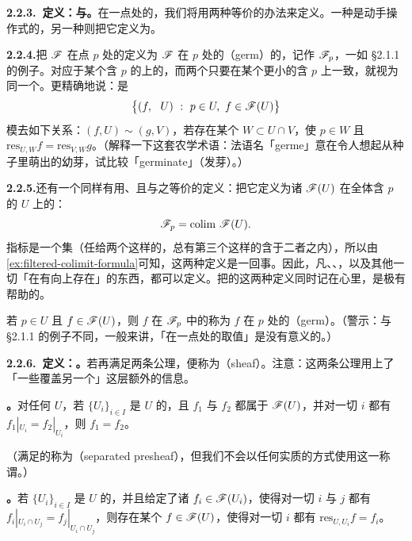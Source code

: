 \textbf{2.2.3.\ 定义：\trStalk{}与\trGerm。}\quad \trPresheaf{}在一点处的\trStalk，我们将用两种等价的办法来定义。一种是动手操作式的，另一种则把它定义为\trColimit。

\textbf{2.2.4.}\quad 把\trPresheaf{} $\mathscr{F}$ 在点 $p$ 处的\textbf{\trStalk}定义为 $\mathscr{F}$ 在 $p$ 处的\textbf{\trGerm}（germ）的\trSet，记作 $\mathscr{F}_p$，一如 \S2.1.1 的例子。\trGerm{}对应于某个含 $p$ 的\trOpenSet{}上的\trSection，而两个\trSection{}只要在某个更小的含 $p$ \trOpenSet{}上一致，就视为同一个。更精确地说：\trStalk{}是
\[
\bigl\{(f,\ \text{\trOpenSet{} } U)\ :\ p\in U,\ f\in\scr{F}(U)\bigr\}
\]
模去如下关系：$(f,U)\sim(g,V)$，若存在某个\trOpenSet{} $W\subset U\cap V$，使 $p\in W$ 且 $\mathrm{res}_{U,W}f=\mathrm{res}_{V,W}g$。（解释一下这套农学术语：法语名「germe」意在令人想起从种子里萌出的幼芽，试比较「germinate」（发芽）。）

\textbf{2.2.5.}\quad \trStalk{}还有一个同样有用、且与之等价的定义：把它定义为诸 $\mathscr{F}(U)$ 在全体含 $p$ 的\trOpenSet{} $U$ 上的\trColimit：
\[
\mathscr{F}_p=\operatorname{colim}\,\mathscr{F}(U).
\]
指标\trCategory{}是一个\trFiltered{}集（任给两个这样的\trOpenSet，总有第三个这样的\trOpenSet{}含于二者之内），所以由\cref{ex:filtered-colimit-formula}可知，这两种定义是一回事。因此，凡\trSetsWord\trSheaf、\trGroup\trSheaf、\trRing\trSheaf，以及其他一切「\trColimit{}在有向\trSet{}上存在」的东西，都可以定义\trStalk。把\trStalk{}的这两种定义同时记在心里，是极有帮助的。

若 $p\in U$ 且 $f\in\mathscr{F}(U)$，则 $f$ 在 $\mathscr{F}_p$ 中的\trImage{}称为 $f$ 在 $p$ 处的\textbf{\trGerm}（germ）。（警示：与 \S2.1.1 的例子不同，一般来讲，\trSection{}「在一点处的取值」是没有意义的。）

\textbf{2.2.6.\ 定义：\trSheaf。}\quad \trPresheaf{}若再满足两条公理，便称为\textbf{\trSheaf}（sheaf）。注意：这两条公理用上了「一些\trOpenSet{}覆盖另一个\trOpenSet」这层额外的信息。

\textbf{\trIdentityAxiom。}\quad 对任何\trOpenSet{} $U$，若 $\{U_i\}_{i\in I}$ 是 $U$ 的\trOpenCover，且 $f_1$ 与 $f_2$ 都属于 $\mathscr{F}(U)$，并对一切 $i$ 都有 $f_1|_{U_i}=f_2|_{U_i}$，则 $f_1=f_2$。

（满足\trIdentityAxiom{}的\trPresheaf{}称为\textbf{\trSeparated\trPresheaf}（separated presheaf），但我们不会以任何实质的方式使用这一称谓。）

\textbf{\trGluingAxiom。}\quad 若 $\{U_i\}_{i\in I}$ 是 $U$ 的\trOpenCover，并且给定了诸 $f_i\in\mathscr{F}(U_i)$，使得对一切 $i$ 与 $j$ 都有 $f_i|_{U_i\cap U_j}=f_j|_{U_i\cap U_j}$，则存在某个 $f\in\mathscr{F}(U)$，使得对一切 $i$ 都有 $\mathrm{res}_{U,U_i}f=f_i$。

